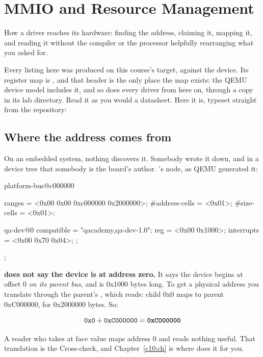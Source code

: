
\section{MMIO and Resource Management}
\label{c6:app:b}

How a driver reaches its hardware: finding the address, claiming it, mapping it, and reading it
without the compiler or the processor helpfully rearranging what you asked for.

Every listing here was produced on this course's target, against the  device. Its
register map is , and that header is the only place the map exists: the
QEMU device model includes it, and so does every driver from here on, through a copy in its lab
directory. Read it as you would a datasheet. Here it is, typeset straight from the repository:


\subsection{Where the address comes from}
\label{c6:app:b1}

On an embedded system, nothing discovers it. Somebody wrote it down, and in a device tree that
somebody is the board's author. 's node, as QEMU generated it:

\begin{console}
platform-bus@c000000 {
        ranges = <0x00 0x00 0xc000000 0x2000000>;
        #address-cells = <0x01>;
        #size-cells = <0x01>;

        qa-dev@0 {
                compatible = "qacademy,qa-dev-1.0";
                reg = <0x00 0x1000>;
                interrupts = <0x00 0x70 0x04>;
        };
};
\end{console}

\noindent \textbf{ does not say the device is at address zero.} It says
the device begins at offset 0 \emph{on its parent bus}, and is 0x1000 bytes long. To get a physical
address you translate through the parent's , which reads: child 0x0 maps to parent
0xC000000, for 0x2000000 bytes. So:

\[
  \texttt{0x0} + \texttt{0xC000000} = \textbf{\texttt{0xC000000}}
\]

\noindent A reader who takes  at face value maps address 0 and reads nothing useful. That
translation is the Cross-check, and Chapter~\ref{c10:ch} is where  does
it for you.

